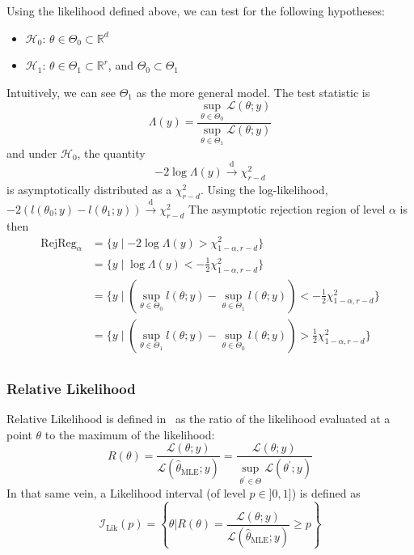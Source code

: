 \documentclass[a4paper,11pt]{article}
\newcommand{\estimtxt}[2]{\hat{#1}_{\mathrm{#2}}}
\theoremstyle{defi}
\numberwithin{thmCounter}{section}
\begin{document}
\label{sec:lik_test}
Using the likelihood defined above, we can test for the following hypotheses:
\begin{itemize}
\item $\mathcal{H}_0$: $\theta \in \Theta_0\subset \mathbb{R}^d$
\item $\mathcal{H}_1$: $\theta \in \Theta_1 \subset \mathbb{R}^r$, and $\Theta_0 \subset \Theta_1$
\end{itemize}
Intuitively, we can see $\Theta_1$ as the more general model.
The test statistic is
\begin{equation}
  \label{eq:def_lik_ratio}
  \Lambda(y) = \frac{\sup_{\theta \in \Theta_0} \mathcal{L}(\theta ; y)}{\sup_{\theta \in \Theta_1} \mathcal{L}(\theta ; y)}
\end{equation}
and under $\mathcal{H}_0$, the quantity 
\begin{equation}
  - 2 \log \Lambda(y) \xrightarrow[]{\mathrm{d}} \chi^2_{r-d}
\end{equation}
is asymptotically distributed as a $\chi^2_{r-d}$.
Using the log-likelihood, $-2(l(\theta_0;y) - l(\theta_1;y)) \xrightarrow{\mathrm{d}} \chi^2_{r-d}$
The asymptotic rejection region of level $\alpha$ is then
\begin{align}
  \mathrm{RejReg}_{\alpha} &= \{y \mid -2 \log \Lambda(y) > \chi^2_{1-\alpha, r-d} \} \\
                           &= \{y \mid \log \Lambda(y) < -\frac12 \chi^2_{1-\alpha, r-d} \} \\
                           &= \{ y \mid (\sup_{\theta\in\Theta_0} l(\theta;y) - \sup_{\theta\in\Theta_1} l(\theta;y)) < -\frac12 \chi^2_{1-\alpha, r-d} \} \\
                           &= \{ y \mid (\sup_{\theta\in\Theta_1} l(\theta;y) - \sup_{\theta\in\Theta_0} l(\theta;y)) > \frac12 \chi^2_{1-\alpha, r-d} \} \\
\end{align}

\subsubsection{Relative Likelihood}
\label{sec:relative_likelihood}
Relative Likelihood is defined in~\cite{kalbfleisch_probability_1985} as the ratio of the likelihood evaluated at a point $\theta$ to the maximum of the likelihood:
\begin{equation}
  R(\theta) = \frac{\mathcal{L}(\theta;y)}{\mathcal{L}(\estimtxt{\theta}{MLE};y)} = \frac{\mathcal{L}(\theta;y)}{\sup_{\theta^{\prime} \in \Theta}\mathcal{L}(\theta^{\prime};y)}
\end{equation}
In that same vein, a Likelihood interval (of level $p\in ]0,1]$) is defined as
\begin{equation}
  \mathcal{I}_{\mathrm{Lik}}(p) = \left\{\theta | R(\theta)=\frac{\mathcal{L}(\theta;y)}{\mathcal{L}(\estimtxt{\theta}{MLE};y)} \geq p\right\}
\end{equation}
\end{document}

